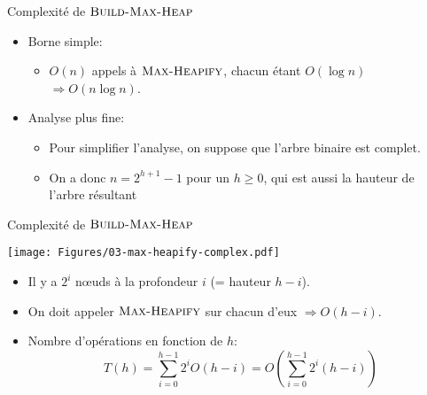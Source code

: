 \begin{frame}{Complexité de $\textnormal{\scshape Build-Max-Heap}$}

\begin{itemize}
\item Borne simple:
\begin{itemize}
\item $O(n)$ appels à $\textnormal{\scshape Max-Heapify}$, chacun étant $O(\log n)$ $\Rightarrow O(n\log n)$.
\end{itemize}

\bigskip


\item Analyse plus fine:
\begin{itemize}
\item Pour simplifier l'analyse, on suppose que l'arbre binaire est complet.
\item On a donc $n=2^{h+1}-1$ pour un $h\geq 0$, qui est aussi la hauteur de l'arbre résultant
\end{itemize}
\end{itemize}

\end{frame}

\begin{frame}{Complexité de $\textnormal{\scshape Build-Max-Heap}$}
\centerline{\texttt{[image: Figures/03-max-heapify-complex.pdf]}}

\begin{itemize}
\item Il y a $2^i$ n\oe uds à la profondeur $i$ (= hauteur $h-i$).
\item On doit appeler $\textnormal{\scshape Max-Heapify}$ sur chacun d'eux $\Rightarrow O(h-i)$.
\item Nombre d'opérations en fonction de $h$:
$$T(h)=\sum_{i=0}^{h-1} 2^i O(h-i)=O(\sum_{i=0}^{h-1} 2^i (h-i))$$
\end{itemize}
\end{frame}

